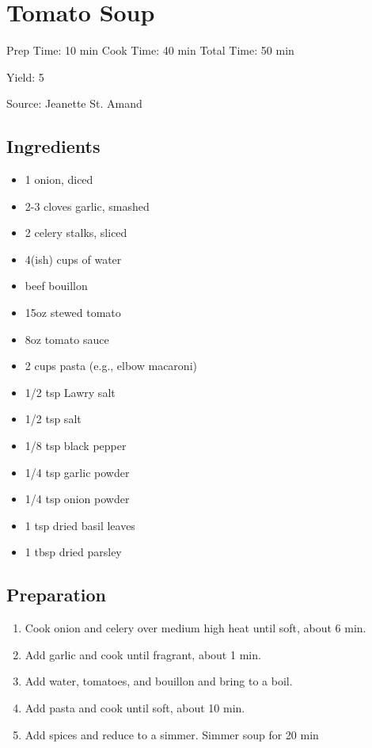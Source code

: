 \section{Tomato Soup}

\begin{center}
Prep Time: 10 min
Cook Time: 40 min
Total Time: 50 min

\noindent Yield: 5

\vspace{1em}

Source: Jeanette St. Amand
\end{center}

\subsection{Ingredients}
\begin{multicols}{2}
\begin{itemize}
    \item 1 onion, diced
    \item 2-3 cloves garlic, smashed
    \item 2 celery stalks, sliced
    \item 4(ish) cups of water
    \item beef bouillon 
    \item 15oz stewed tomato
    \item 8oz tomato sauce
    \item 2 cups pasta (e.g., elbow macaroni)
    \item 1/2 tsp Lawry salt
    \item 1/2 tsp salt
    \item 1/8 tsp black pepper
    \item 1/4 tsp garlic powder
    \item 1/4 tsp onion powder
    \item 1 tsp dried basil leaves
    \item 1 tbsp dried parsley 
\end{itemize}
\end{multicols}

\subsection{Preparation}
\begin{enumerate}
    \item Cook onion and celery over medium high heat until soft, about 6 min.
    \item Add garlic and cook until fragrant, about 1 min.
    \item Add water, tomatoes, and bouillon and bring to a boil.
    \item Add pasta and cook until soft, about 10 min.
    \item Add spices and reduce to a simmer. Simmer soup for 20 min
\end{enumerate}

